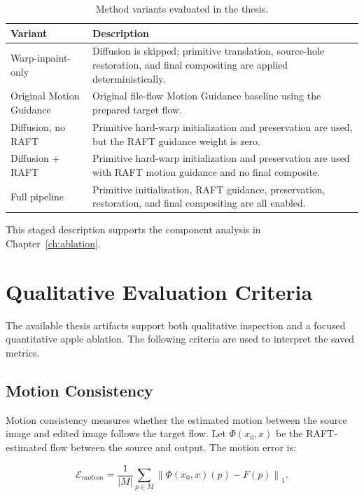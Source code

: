 \begin{table}[t]
  \caption{Method variants evaluated in the thesis.}
  \centering
  \small
  \begin{tabular}{p{1.35in}|p{3.6in}}
    \hline
    Variant & Description \\ \hline \hline
    Warp-inpaint-only & Diffusion is skipped; primitive translation, source-hole restoration, and final compositing are applied deterministically. \\ \hline
    Original Motion Guidance & Original file-flow Motion Guidance baseline using the prepared target flow. \\ \hline
    Diffusion, no RAFT & Primitive hard-warp initialization and preservation are used, but the RAFT guidance weight is zero. \\ \hline
    Diffusion + RAFT & Primitive hard-warp initialization and preservation are used with RAFT motion guidance and no final composite. \\ \hline
    Full pipeline & Primitive initialization, RAFT guidance, preservation, restoration, and final compositing are all enabled. \\ \hline
  \end{tabular}
  \label{tab:method-variants}
\end{table}

This staged description supports the component analysis in Chapter~\ref{ch:ablation}.

\section{Qualitative Evaluation Criteria}

The available thesis artifacts support both qualitative inspection and a focused quantitative apple ablation. The following criteria are used to interpret the saved metrics.

\subsection{Motion Consistency}

Motion consistency measures whether the estimated motion between the source image and edited image follows the target flow. Let $\Phi(x_0,x)$ be the RAFT-estimated flow between the source and output. The motion error is:

\begin{equation}
\mathcal{E}_{motion} =
\frac{1}{|M|}
\sum_{p \in M}
\left\|
\Phi(x_0,x)(p)-F(p)
\right\|_1.
\label{eq:motion-error}
\end{equation}

